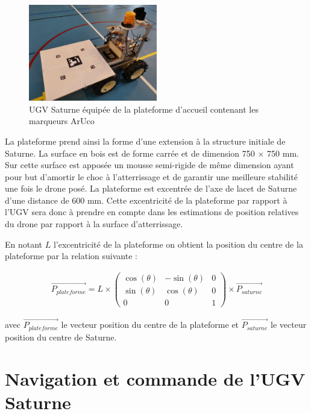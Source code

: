\begin{figure}[H]
    \centering\includegraphics[width=0.5\textwidth]{images/ugv/ugv3.jpg}
    \caption{UGV Saturne équipée de la plateforme d'accueil contenant les marqueurs ArUco}
\end{figure}

La plateforme prend ainsi la forme d’une extension à la structure initiale de Saturne. La surface en bois est de forme carrée et de dimension 750 $\times$ 750 mm. Sur cette surface est apposée un mousse semi-rigide de même dimension ayant pour but d’amortir le choc à l’atterrissage et de garantir une meilleure stabilité une fois le drone posé. La plateforme est excentrée de l’axe de lacet de Saturne d’une distance de 600 mm. Cette excentricité de la plateforme par rapport à l’UGV sera donc à prendre en compte dans les estimations de position relatives du drone par rapport à la surface d'atterrissage.

En notant $L$ l’excentricité de la plateforme on obtient la position du centre de la plateforme par la relation suivante :

\begin{align}
    \overrightarrow{P_{plateforme}} = L \times \begin{pmatrix}
    \cos(\theta) & -\sin(\theta) & 0 \\
    \sin(\theta) & \cos(\theta) & 0 \\
    0 & 0 & 1
    \end{pmatrix}
    \times \overrightarrow{P_{saturne}}
\end{align}

avec $\overrightarrow{P_{plateforme}}$ le vecteur position du centre de la plateforme et $\overrightarrow{P_{saturne}}$ le vecteur position du centre de Saturne.

\section{Navigation et commande de l’UGV Saturne}

